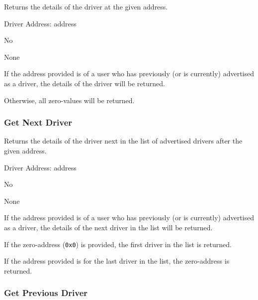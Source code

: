 \begin{description}[leftmargin=8em,style=nextline]
	\item [Description]
		Returns the details of the driver at the given address.
	\item [Arguments]
		Driver Address: address
	\item [Payable]
		No
	\item [Preconditions]
		None
	\item [Postconditions]
		If the address provided is of a user who has previously (or is currently) advertised as a driver, the details of the driver will be returned.
		
		Otherwise, all zero-values will be returned.
\end{description}

\subsubsection{Get Next Driver}

\begin{description}[leftmargin=8em,style=nextline]
	\item [Description]
		Returns the details of the driver next in the list of advertised drivers after the given address.
	\item [Arguments]
		Driver Address: address
	\item [Payable]
		No
	\item [Preconditions]
		None
	\item [Postconditions]
		If the address provided is of a user who has previously (or is currently) advertised as a driver, the details of the next driver in the list will be returned.
		
		If the zero-address (\lstinline{0x0}) is provided, the first driver in the list is returned.
		
		If the address provided is for the last driver in the list, the zero-address is returned.
\end{description}

\subsubsection{Get Previous Driver}

